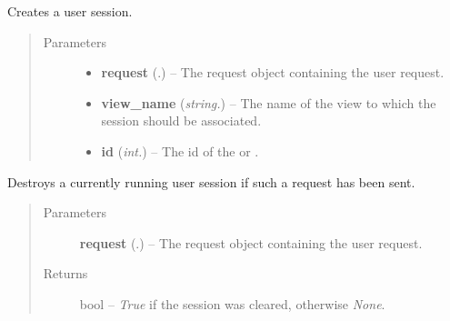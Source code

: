 \documentclass[letterpaper,10pt,english]{sphinxmanual}
\begin{document}

\begin{fulllineitems}
\label{Contour.contour:Contour.contour.views.create_session}
Creates a user session.
\begin{quote}\begin{description}
\item[{Parameters}] \leavevmode\begin{itemize}
\item {} 
\textbf{request} (.) -- The request object containing the user request.

\item {} 
\textbf{view\_name} (\emph{string.}) -- The name of the view to which the session should be associated.

\item {} 
\textbf{id} (\emph{int.}) -- The id of the {\hyperref[Contour.contour:Contour.contour.models.Image]{}} or {\hyperref[Contour.contour:Contour.contour.models.Track]{}}.

\end{itemize}

\end{description}\end{quote}

\end{fulllineitems}


\begin{fulllineitems}
\label{Contour.contour:Contour.contour.views.destroy_session}
Destroys a currently running user session if such a request has been sent.
\begin{quote}\begin{description}
\item[{Parameters}] \leavevmode
\textbf{request} (.) -- The request object containing the user request.

\item[{Returns}] \leavevmode
bool -- \emph{True} if the session was cleared, otherwise \emph{None}.

\end{description}\end{quote}

\end{fulllineitems}
\end{document}
